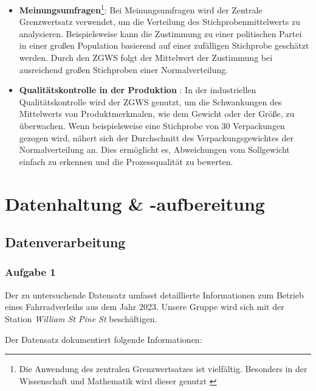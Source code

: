 \documentclass[a4paper, 12pt]{article}
\begin{document}
\begin{itemize}
    \item  \textbf{Meinungsumfragen}\footnote{Die Anwendung des zentralen Grenzwertsatzes ist vielfältig. Besonders in der Wissenschaft und Mathematik wird dieser genutzt \cite{3} \label{footnote2}}:
    Bei Meinungsumfragen wird der Zentrale Grenzwertsatz verwendet, um die Verteilung des Stichprobenmittelwerts zu analysieren. Beispielsweise kann die Zustimmung zu einer politischen Partei in einer großen Population basierend auf einer zufälligen Stichprobe geschätzt werden. Durch den ZGWS folgt der Mittelwert der Zustimmung bei ausreichend großen Stichproben einer Normalverteilung.
    \item \textbf{Qualitätskontrolle in der
    Produktion} \hyperlink{footnote.\getrefnumber{footnote2}}{\textsuperscript{}}:
    In der industriellen Qualitätskontrolle wird der ZGWS genutzt, um die Schwankungen des Mittelwerts von Produktmerkmalen, wie dem Gewicht oder der Größe, zu überwachen. Wenn beispielsweise eine Stichprobe von 30 Verpackungen gezogen wird, nähert sich der Durchschnitt des Verpackungsgewichtes der Normalverteilung an. Dies ermöglicht es, Abweichungen vom Sollgewicht einfach zu erkennen und die Prozessqualität zu bewerten.
\end{itemize}

\newpage

\section{Datenhaltung \& -aufbereitung}

\subsection{Datenverarbeitung}
\subsubsection{Aufgabe 1}

Der zu untersuchende Datensatz umfasst detaillierte Informationen zum Betrieb eines Fahrradverleihs aus dem Jahr 2023. Unsere Gruppe wird sich mit der Station \textit{William St \And Pine St} beschäftigen. 
\par
\par
\vspace{\baselineskip}

\noindent Der Datensatz dokumentiert folgende Informationen:
\end{document}
